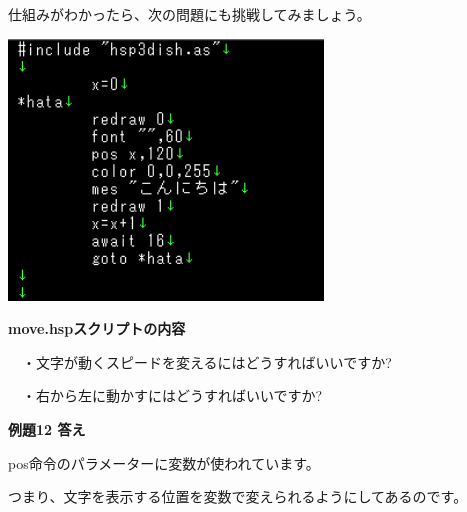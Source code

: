 \documentclass[a4paper,dvipdfmx]{jarticle}
\begin{document}
仕組みがわかったら、次の問題にも挑戦してみましょう。


\bigskip



\begin{center}
\includegraphics[width=8.373cm,height=6.932cm]{text02-img/text02-img050.png}

\end{center}

\bigskip


\bigskip


\bigskip


\bigskip


\bigskip


\bigskip


\bigskip


\bigskip


\bigskip


\bigskip


\bigskip

{\bfseries
move.hspスクリプトの内容}


\bigskip


\bigskip


\bigskip


\bigskip


\bigskip

\ \ ・文字が動くスピードを変えるにはどうすればいいですか?

\ \ ・右から左に動かすにはどうすればいいですか?


\bigskip


\bigskip

{\bfseries
例題12 答え}


\bigskip

pos命令のパラメーターに変数が使われています。

つまり、文字を表示する位置を変数で変えられるようにしてあるのです。
\end{document}
